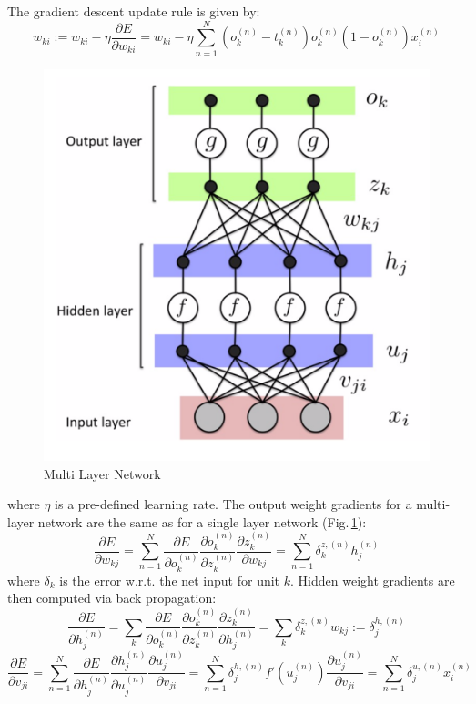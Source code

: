 The gradient descent update rule is given by:
$$w_{ki} := w_{ki} - \eta \frac{\partial E}{\partial w_{ki}} = w_{ki} - \eta  \sum_{n=1}^N (o_k^{(n)} - t_k^{(n)})o_k^{(n)} (1-o_k^{(n)}) x_i^{(n)}$$
\begin{figure}[h]
	\centering
	\includegraphics[scale=0.5]{Figs/multilayerbackprop.png}
    \caption{Multi Layer Network}
    \label{multi}
\end{figure}
where $\eta$ is a pre-defined learning rate. The output weight gradients for a multi-layer network are the same as for a single layer network (Fig.\,\ref{multi}):
$$\frac{\partial E}{\partial w_{kj}} =  \sum_{n=1}^N \frac{\partial E}{\partial o_{k}^{(n)}}\frac{\partial o_{k}^{(n)}}{\partial z_{k}^{(n)}} \frac{\partial z_{k}^{(n)}}{\partial w_{kj}} = \sum_{n=1}^N \delta_k^{z,(n)} h_j^{(n)}$$
where $\delta_k$ is the error w.r.t. the net input for unit $k$. Hidden weight gradients are then computed via back propagation:
$$\frac{\partial E}{\partial h_{j}^{(n)}} =  \sum_{k} \frac{\partial E}{\partial o_{k}^{(n)}}\frac{\partial o_{k}^{(n)}}{\partial z_{k}^{(n)}} \frac{\partial z_{k}^{(n)}}{\partial h_{j}^{(n)}} = \sum_{k} \delta_k^{z,(n)} w_{kj} := \delta_j^{h,(n)}$$
$$ \frac{\partial E}{\partial v_{ji}} 
= \sum_{n=1}^N \frac{\partial E}{\partial h_{j}^{(n)}}\frac{\partial h_{j}^{(n)}}{\partial u_{j}^{(n)}} \frac{\partial u_j^{(n)}}{\partial v_{ji}}
= \sum_{n=1}^N \delta_j^{h,(n)} f'(u_j^{(n)})\frac{\partial u_j^{(n)}}{\partial v_{ji}} 
= \sum_{n=1}^N \delta_j^{u,(n)} x_i^{(n)} $$

